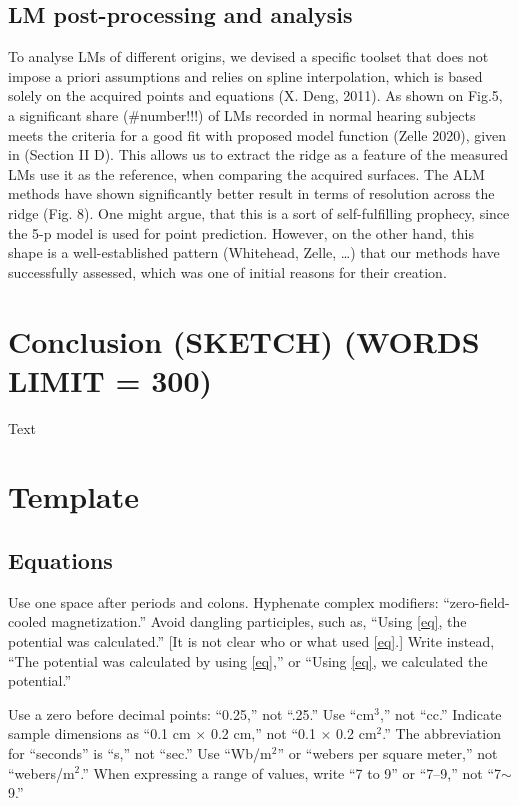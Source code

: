 \documentclass[journal,twoside,web]{ieeecolor2}
\begin{document}
\subsection{LM post-processing and analysis}
To analyse LMs of different origins, we devised a specific toolset that does not impose a priori assumptions and relies on spline interpolation, which is based solely on the acquired points and equations (X. Deng, 2011). As shown on Fig.5, a significant share (\#number!!!) of LMs recorded in normal hearing subjects meets the criteria for a good fit with proposed model function (Zelle 2020), given in (Section II D). This allows us to extract the ridge as a feature of the measured LMs use it as the reference, when comparing the acquired surfaces. The ALM methods have shown significantly better result in terms of resolution across the ridge (Fig. 8). One might argue, that this is a sort of self-fulfilling prophecy, since the 5-p model is used for point prediction. However, on the other hand, this shape is a well-established pattern (Whitehead, Zelle, …) that our methods have successfully assessed, which was one of initial reasons for their creation.

\section{Conclusion (SKETCH) (WORDS LIMIT = 300)}
Text

\section{Template}

\subsection{Equations}
Use one space after periods and colons. Hyphenate complex modifiers: 
``zero-field-cooled magnetization.'' Avoid dangling participles, such as, 
``Using \eqref{eq}, the potential was calculated.'' [It is not clear who or what 
used \eqref{eq}.] Write instead, ``The potential was calculated by using \eqref{eq},'' or 
``Using \eqref{eq}, we calculated the potential.''

Use a zero before decimal points: ``0.25,'' not ``.25.'' Use 
``cm$^{3}$,'' not ``cc.'' Indicate sample dimensions as ``0.1 cm 
$\times $ 0.2 cm,'' not ``0.1 $\times $ 0.2 cm$^{2}$.'' The 
abbreviation for ``seconds'' is ``s,'' not ``sec.'' Use 
``Wb/m$^{2}$'' or ``webers per square meter,'' not 
``webers/m$^{2}$.'' When expressing a range of values, write ``7 to 
9'' or ``7--9,'' not ``7$\sim $9.''
\end{document}
